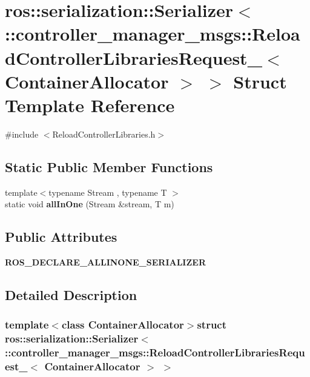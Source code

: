 \section{ros\-:\-:serialization\-:\-:\-Serializer$<$ \-:\-:controller\-\_\-manager\-\_\-msgs\-:\-:\-Reload\-Controller\-Libraries\-Request\-\_\-$<$ \-Container\-Allocator $>$ $>$ \-Struct \-Template \-Reference}
\label{structros_1_1serialization_1_1Serializer_3_01_1_1controller__manager__msgs_1_1ReloadControllerLie8248050ed908d0e9e8a386daf8de597}


{\ttfamily \#include $<$\-Reload\-Controller\-Libraries.\-h$>$}

\subsection*{\-Static \-Public \-Member \-Functions}
\begin{DoxyCompactItemize}
\item 
{\footnotesize template$<$typename Stream , typename T $>$ }\\static void {\bf all\-In\-One} (\-Stream \&stream, \-T m)
\end{DoxyCompactItemize}
\subsection*{\-Public \-Attributes}
\begin{DoxyCompactItemize}
\item 
{\bf \-R\-O\-S\-\_\-\-D\-E\-C\-L\-A\-R\-E\-\_\-\-A\-L\-L\-I\-N\-O\-N\-E\-\_\-\-S\-E\-R\-I\-A\-L\-I\-Z\-E\-R}
\end{DoxyCompactItemize}


\subsection{\-Detailed \-Description}
\subsubsection*{template$<$class Container\-Allocator$>$struct ros\-::serialization\-::\-Serializer$<$ \-::controller\-\_\-manager\-\_\-msgs\-::\-Reload\-Controller\-Libraries\-Request\-\_\-$<$ Container\-Allocator $>$ $>$}



